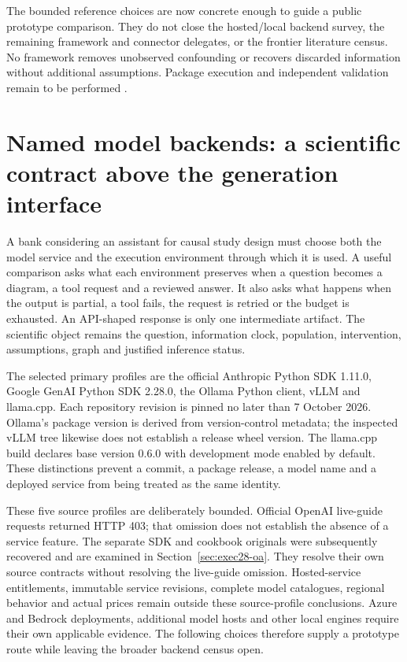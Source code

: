 The bounded reference choices are now concrete enough to guide a public
prototype comparison. They do not close the hosted/local backend survey,
the remaining framework and connector delegates, or the frontier literature
census. No framework removes unobserved confounding or recovers discarded
information without additional assumptions. Package execution and independent validation remain to be performed
\citep{exec24_framework_contracts}.


\section{Named model backends: a scientific contract above the generation interface}
\label{sec:exec24-backend-census}

A bank considering an assistant for causal study design must choose both the
model service and the execution environment through which it is used. A useful
comparison asks what each environment preserves when a question becomes a
diagram, a tool request and a reviewed answer. It also asks what happens when
the output is partial, a tool fails, the request is retried or the budget is
exhausted. An API-shaped response is only one intermediate artifact. The
scientific object remains the question, information clock, population,
intervention, assumptions, graph and justified inference status.
\citep{exec24_backend_reference}

The selected primary profiles are the official Anthropic Python SDK 1.11.0,
Google GenAI Python SDK 2.28.0, the Ollama Python client, vLLM and llama.cpp.
Each repository revision is pinned no later than 7 October 2026. Ollama's
package version is derived from version-control metadata; the inspected
vLLM tree likewise does not establish a release wheel version. The llama.cpp
build declares base version 0.6.0 with development mode enabled by default.
These distinctions prevent a commit, a package release, a model name and a
deployed service from being treated as the same identity.
\citep{exec24_backend_anthropic,exec24_backend_google,exec24_backend_ollama,
exec24_backend_vllm,exec24_backend_llamacpp}

These five source profiles are deliberately bounded. Official OpenAI live-guide
requests returned HTTP 403; that omission does not establish the absence of a
service feature. The separate SDK and cookbook originals were subsequently
recovered and are examined in Section~\ref{sec:exec28-oa}. They resolve their
own source contracts without resolving the live-guide omission. Hosted-service
entitlements, immutable service revisions, complete model catalogues, regional
behavior and actual prices remain outside these source-profile conclusions. Azure and Bedrock deployments, additional
model hosts and other local engines require their own applicable evidence.
The following choices therefore supply a prototype route while leaving the
broader backend census open.~\citep{exec24_backend_reference}

